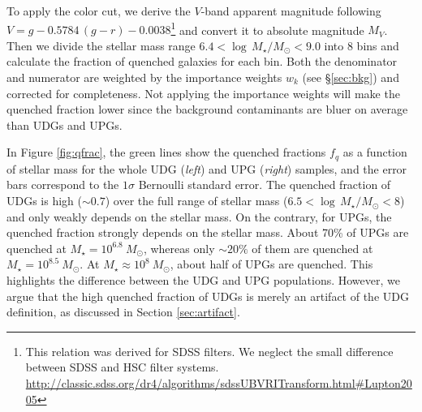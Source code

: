 \documentclass[twocolumn,astrosymb,twocolappendix]{aastex631}
\begin{document}
\begin{CJK*}{UTF8}{gbsn}
To apply the color cut, we derive the $V$-band apparent magnitude following $V = g - 0.5784\, (g - r) - 0.0038$\footnote{This relation was derived for SDSS filters. We neglect the small difference between SDSS and HSC filter systems. \url{http://classic.sdss.org/dr4/algorithms/sdssUBVRITransform.html\#Lupton2005}} and convert it to absolute magnitude $M_V$. Then we divide the stellar mass range $6.4 < \log\,M_\star/M_\odot < 9.0$ into 8 bins and calculate the fraction of quenched galaxies for each bin. Both the denominator and numerator are weighted by the importance weights $w_k$ (see \S \ref{sec:bkg}) and corrected for completeness. Not applying the importance weights will make the quenched fraction lower since the background contaminants are bluer on average than UDGs and UPGs.

In Figure \ref{fig:qfrac}, the green lines show the quenched fractions $f_q$ as a function of stellar mass for the whole UDG (\textit{left}) and UPG (\textit{right}) samples, and the error bars correspond to the $1\sigma$ Bernoulli standard error. The quenched fraction of UDGs is high ($\sim 0.7$) over the full range of stellar mass ($6.5 < \log\,M_\star/M_\odot < 8$) and only weakly depends on the stellar mass. On the contrary, for UPGs, the quenched fraction strongly depends on the stellar mass. About 70\% of UPGs are quenched at $M_\star = 10^{6.8}\ M_\odot$, whereas only $\sim20\%$ of them are quenched at $M_\star = 10^{8.5}\ M_\odot$. At $M_\star \approx 10^{8}\ M_\odot$, about half of UPGs are quenched. This highlights the difference between the UDG and UPG populations. However, we argue that the high quenched fraction of UDGs is merely an artifact of the UDG definition, as discussed in Section \ref{sec:artifact}.



\end{CJK*}
\end{document}
